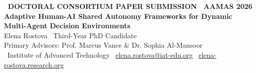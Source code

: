 \documentclass[11pt,a4paper]{scrartcl}
\begin{document}
\begin{tcolorbox}[
    colback=NavyPrimary,
    colframe=NavyPrimary,
    arc=6pt,
    left=16pt, right=16pt, top=14pt, bottom=14pt
]
    \centering
    {\sffamily\small\bfseries\color{AmberHighlight}\MakeUppercase{\faGraduationCap\ Doctoral Consortium Paper Submission \textbullet\ AAMAS 2026}}\\[6pt]
    {\sffamily\LARGE\bfseries\color{white} Adaptive Human-AI Shared Autonomy Frameworks for Dynamic Multi-Agent Decision Environments}\\[8pt]
    {\sffamily\large\color{SlateBorder} Elena Rostova \textbullet\ Third-Year PhD Candidate}\\[3pt]
    {\sffamily\small\color{SlateBorder} Primary Advisors: Prof. Marcus Vance \& Dr. Sophia Al-Mansoor}\\[6pt]
    {\sffamily\small\color{TealAccent}
        \faUniversity\ Institute of Advanced Technology \quad 
        \faEnvelope\ \href{mailto:elena.rostova@iat-edu.org}{elena.rostova@iat-edu.org} \quad 
        \faGlobe\ \href{https://elena-rostova.research.org}{elena-rostova.research.org}
    }
\end{tcolorbox}

\vspace{10pt}
\end{document}
